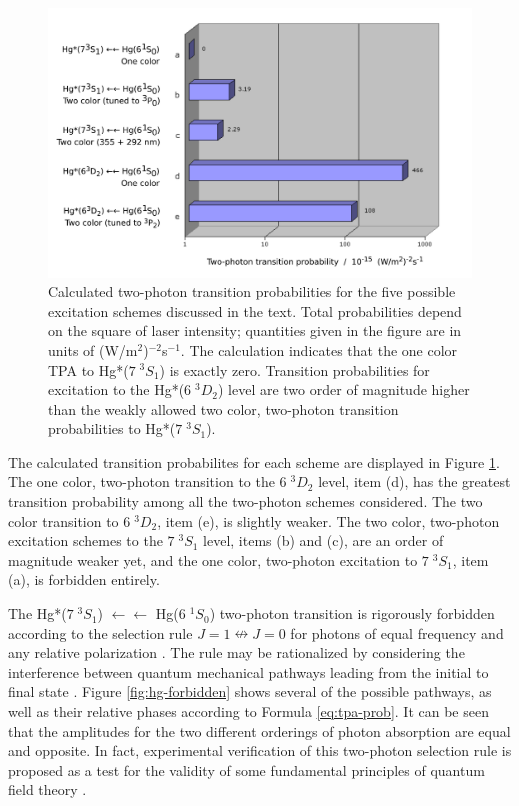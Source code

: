 \documentclass[12pt]{mitthesis}
\begin{document}
\begin{figure}
  \caption{Calculated two-photon transition probabilities for the five
    possible excitation schemes discussed in the text.  Total
    probabilities depend on the square of laser intensity; quantities
    given in the figure are in units of (W/m$^2$)$^{-2}$s$^{-1}$.  The
    calculation indicates that the one color TPA to Hg*($7 \; ^3S_1$)
    is exactly zero.  Transition probabilities for excitation to the
    Hg*($6 \; ^3D_2$) level are two order of magnitude higher than the
    weakly allowed two color, two-photon transition probabilities to
    Hg*($7 \; ^3S_1$).}
  \label{fig:tpa-prob}
  \centering
  \includegraphics[width=7in,angle=90]{tpt-probs.pdf}
\end{figure}

The calculated transition probabilites for each scheme are displayed
in Figure \ref{fig:tpa-prob}.  The one color, two-photon transition to
the $6 \; ^3D_2$ level, item (d), has the greatest transition
probability among all the two-photon schemes considered.  The
two color transition to $6 \; ^3D_2$, item (e), is slightly weaker.
The two color, two-photon excitation schemes to the $7 \; ^3S_1$ level,
items (b) and (c), are an order of magnitude weaker yet, and the
one color, two-photon excitation to $7 \; ^3S_1$, item (a), is
forbidden entirely.

The Hg*($7 \; ^3S_1$) $\leftarrow\leftarrow$ Hg($6 \; ^1S_0$)
two-photon transition is rigorously forbidden according to the
selection rule $J=1 \nleftrightarrow J=0$ for photons of equal
frequency and any relative polarization \cite{bonin84}.  The rule may
be rationalized by considering the interference between quantum
mechanical pathways leading from the initial to final state
\cite{bonin84, grynberg77}.  Figure \ref{fig:hg-forbidden} shows
several of the possible pathways, as well as their relative phases
according to Formula \ref{eq:tpa-prob}.  It can be seen that the
amplitudes for the two different orderings of photon absorption are
equal and opposite.  In fact, experimental verification of this
two-photon selection rule is proposed as a test for the validity of
some fundamental principles of quantum field theory \cite{hilborn02}.
\end{document}

